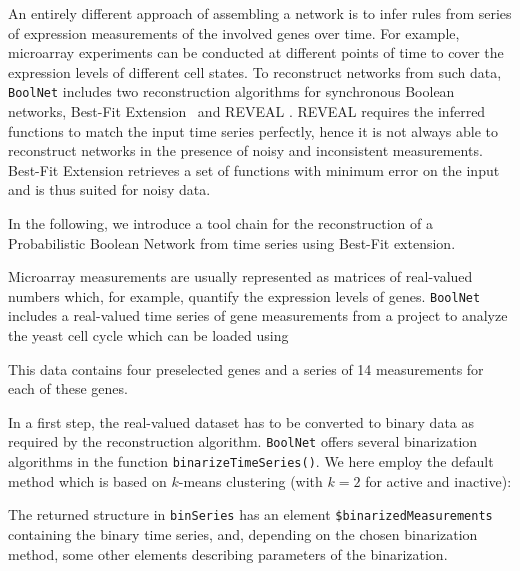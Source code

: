 \documentclass[a4paper]{article}
\begin{document}
An entirely different approach of assembling a network is to infer rules from series of expression measurements of the involved genes over time. For example, microarray experiments can be conducted at different points of time to cover the expression levels of different cell states. To reconstruct networks from such data, \texttt{BoolNet} includes two  
reconstruction algorithms for synchronous Boolean networks, Best-Fit Extension~\cite{laehdesmaeki03} and REVEAL \cite{liang98}. REVEAL requires the inferred functions to match the input time series perfectly, hence it is not always able to reconstruct networks in the presence of noisy and inconsistent measurements. Best-Fit Extension retrieves a set of functions with minimum error on the input and is thus suited for noisy data. 

In the following, we introduce a tool chain for the reconstruction of a Probabilistic Boolean Network from time series using Best-Fit extension.

Microarray measurements are usually represented as matrices of real-valued numbers which, for example, quantify the expression levels of genes. \texttt{BoolNet} includes a real-valued time series of gene measurements  from a project to analyze the yeast cell cycle \cite{spellman98} which can be loaded using
\begin{knitrout}
\color{fgcolor}\begin{kframe}
\begin{alltt}
\end{alltt}
\end{kframe}
\end{knitrout}
This data contains four preselected genes and a series of 14 measurements for each of these genes.

\begin{sloppypar}
In a first step, the real-valued dataset has to be converted to binary data as required by the reconstruction algorithm. \texttt{BoolNet} offers several binarization algorithms in the function \texttt{binarizeTimeSeries()}. We here employ the default method which is based on $k$-means clustering (with $k=2$ for active and inactive):
\end{sloppypar}
\begin{knitrout}
\color{fgcolor}\begin{kframe}
\begin{alltt}
 \hlkwb{<-} 
\end{alltt}
\end{kframe}
\end{knitrout}
The returned structure in \texttt{binSeries} has an element \texttt{\$binarizedMeasurements} containing the binary time series, and, depending on the chosen binarization method, some other elements describing parameters of the binarization.
\end{document}
